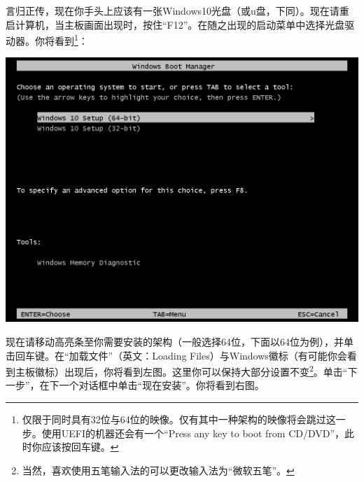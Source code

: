 言归正传，现在你手头上应该有一张Windows10光盘（或u盘，下同）。现在请重启计算机，当主板画面出现时，按住“F12”。在随之出现的启动菜单中选择光盘驱动器。你将看到\footnote{仅限于同时具有32位与64位的映像。仅有其中一种架构的映像将会跳过这一步。使用UEFI的机器还会有一个“Press any key to boot from CD/DVD”，此时你应该按回车键。}：
\begin{center}
	\includegraphics[scale=0.4]{pic/win10setup1}
\end{center} \par
现在请移动高亮条至你需要安装的架构（一般选择64位，下面以64位为例），并单击回车键。在“加载文件”（英文：Loading Files）与Windows徽标（有可能你会看到主板徽标）出现后，你将看到左图。这里你可以保持大部分设置不变\footnote{当然，喜欢使用五笔输入法的可以更改输入法为“微软五笔”。}。单击“下一步”，在下一个对话框中单击“现在安装”。你将看到右图。
